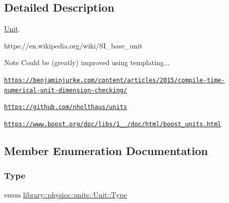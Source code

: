 \subsection{Detailed Description}
\hyperlink{classlibrary_1_1physics_1_1units_1_1_unit}{Unit}. 

https\+://en.wikipedia.\+org/wiki/\+S\+I\+\_\+base\+\_\+unit

\begin{DoxyNote}{Note}
Could be (greatly) improved using templating... 

\href{https://benjaminjurke.com/content/articles/2015/compile-time-numerical-unit-dimension-checking/}{\tt https\+://benjaminjurke.\+com/content/articles/2015/compile-\/time-\/numerical-\/unit-\/dimension-\/checking/} 

\href{https://github.com/nholthaus/units}{\tt https\+://github.\+com/nholthaus/units} 

\href{https://www.boost.org/doc/libs/1_67_0/doc/html/boost_units.html}{\tt https\+://www.\+boost.\+org/doc/libs/1\+\_\+\_/doc/html/boost\+\_\+units.\+html} 
\end{DoxyNote}


\subsection{Member Enumeration Documentation}
\mbox{\label{classlibrary_1_1physics_1_1units_1_1_unit_a828bc1b6ad6fa5cbef904ea0fede986a}} 
\subsubsection{\texorpdfstring{Type}{Type}}
{\footnotesize\ttfamily enum \hyperlink{classlibrary_1_1physics_1_1units_1_1_unit_a828bc1b6ad6fa5cbef904ea0fede986a}{library\+::physics\+::units\+::\+Unit\+::\+Type}\hspace{0.3cm}{\ttfamily [strong]}}

